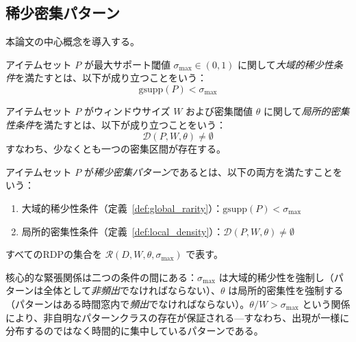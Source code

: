 \subsection{稀少密集パターン}

本論文の中心概念を導入する。

\begin{definition}[大域的稀少性条件]\label{def:global_rarity}
アイテムセット $P$ が最大サポート閾値 $\sigma_{\max} \in (0, 1)$ に関して\emph{大域的稀少性条件}を満たすとは、以下が成り立つことをいう：
\begin{equation}
\text{gsupp}(P) < \sigma_{\max}
\label{eq:rarity}
\end{equation}
\end{definition}

\begin{definition}[局所的密集性条件]\label{def:local_density}
アイテムセット $P$ がウィンドウサイズ $W$ および密集閾値 $\theta$ に関して\emph{局所的密集性条件}を満たすとは、以下が成り立つことをいう：
\begin{equation}
\mathcal{D}(P, W, \theta) \neq \emptyset
\label{eq:density}
\end{equation}
すなわち、少なくとも一つの密集区間が存在する。
\end{definition}

\begin{definition}\label{def:rdp}
アイテムセット $P$ が\emph{稀少密集パターン}であるとは、以下の両方を満たすことをいう：
\begin{enumerate}
\item 大域的稀少性条件（定義~\ref{def:global_rarity}）：$\text{gsupp}(P) < \sigma_{\max}$
\item 局所的密集性条件（定義~\ref{def:local_density}）：$\mathcal{D}(P, W, \theta) \neq \emptyset$
\end{enumerate}
すべてのRDPの集合を $\mathcal{R}(D, W, \theta, \sigma_{\max})$ で表す。
\end{definition}

\begin{remark}
核心的な緊張関係は二つの条件の間にある：$\sigma_{\max}$ は大域的稀少性を強制し（パターンは全体として\emph{非頻出}でなければならない）、$\theta$ は局所的密集性を強制する（パターンはある時間窓内で\emph{頻出}でなければならない）。$\theta / W > \sigma_{\max}$ という関係により、非自明なパターンクラスの存在が保証される---すなわち、出現が一様に分布するのではなく時間的に集中しているパターンである。
\end{remark}

